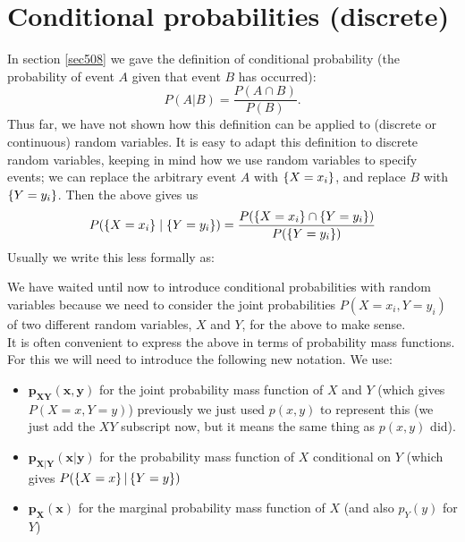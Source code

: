 \section{Conditional probabilities (discrete)} \label{discrete conditional probability}
In section \ref{sec508} we gave the definition of conditional probability (the probability of event $A$ given that event $B$ has occurred): 
\[
P(A|B) = \frac{P(A \cap B)}{P(B)}.
\]
Thus far, we have not shown how this definition can be applied to (discrete or continuous) random variables. It is easy to adapt this definition to discrete random variables, keeping in mind how we use random variables to specify events; we can replace the arbitrary event $A$ with $\left\{X = x_i\right\}$, and replace $B$ with $\left\{Y = y_i\right\}$. Then the above gives us
\[
P(\left\{X = x_i\right\} \mid \left\{Y = y_i\right\}) = \frac{P(\left\{X = x_i\right\} \cap \left\{Y = y_i\right\})}{P(\left\{Y = y_i\right\})}
\]
Usually we write this less formally as: 
  
  	\bigskip
	
	\hfil{}
	\bigskip
	\bigskip
	
\noindent We have waited until now to introduce conditional probabilities with random variables because we need to consider the joint probabilities $P(X = x_i, Y = y_i)$ of two different random variables, $X$ and $Y$, for the above to make sense. \\

\noindent It is often convenient to express the above in terms of probability mass functions. For this we will need to introduce the following new notation. We use: \label{p_{XY}(x,y),p_{X|Y}(x|y),p_X(x)}
\begin{itemize}
\item $\boldsymbol{p_{XY}(x,y)}$ for the joint probability mass function of $X$ and $Y$ (which gives $P(X = x,Y=y)$) previously we just used $p(x,y)$ to represent this (we just add the $XY$ subscript now, but it means the same thing as $p(x,y)$ did).
\item $\boldsymbol{p_{X|Y}(x|y)}$ for the probability mass function of $X$ conditional on $Y$ (which gives $P(\left\{X = x\right\}|\left\{Y = y\right\})$
\item $\boldsymbol{p_X(x)}$ for the marginal probability mass function of $X$ (and also $p_Y(y)$ for $Y$)
\end{itemize}

